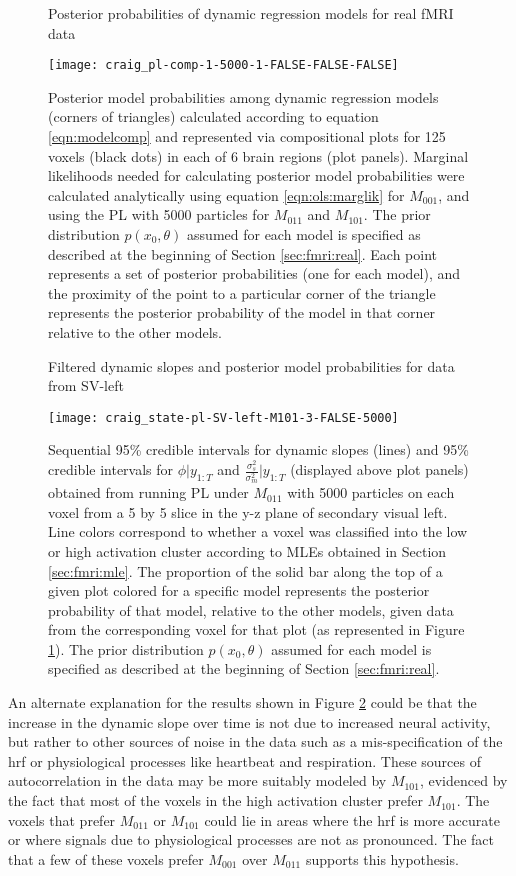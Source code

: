 \begin{figure}
\ssp
\centering
\caption{Posterior probabilities of dynamic regression models for real fMRI data} \label{fig:fmri:comp:real}
\texttt{[image: craig\_pl-comp-1-5000-1-FALSE-FALSE-FALSE]}
\caption*{Posterior model probabilities among dynamic regression models (corners of triangles) calculated according to equation \eqref{eqn:modelcomp} and represented via compositional plots for 125 voxels (black dots) in each of 6 brain regions (plot panels). Marginal likelihoods needed for calculating posterior model probabilities were calculated analytically using equation \eqref{eqn:ols:marglik} for $M_{001}$, and using the PL with 5000 particles for $M_{011}$ and $M_{101}$. The prior distribution $p(x_0,\theta)$ assumed for each model is specified as described at the beginning of Section \ref{sec:fmri:real}. Each point represents a set of posterior probabilities (one for each model), and the proximity of the point to a particular corner of the triangle represents the posterior probability of the model in that corner relative to the other models.}
\end{figure}

\begin{figure}
\ssp
\centering
\caption{Filtered dynamic slopes and posterior model probabilities for data from SV-left} \label{fig:fmri:slopes:real}
\texttt{[image: craig\_state-pl-SV-left-M101-3-FALSE-5000]}
\caption*{Sequential 95\% credible intervals for dynamic slopes (lines) and 95\% credible intervals for $\phi|y_{1:T}$ and $\frac{\sigma^2_s}{\sigma^2_m}|y_{1:T}$ (displayed above plot panels) obtained from running PL under $M_{011}$ with 5000 particles on each voxel from a 5 by 5 slice in the y-z plane of secondary visual left. Line colors correspond to whether a voxel was classified into the low or high activation cluster according to MLEs obtained in Section \ref{sec:fmri:mle}. The proportion of the solid bar along the top of a given plot colored for a specific model represents the posterior probability of that model, relative to the other models, given data from the corresponding voxel for that plot (as represented in Figure \ref{fig:fmri:comp:real}). The prior distribution $p(x_0,\theta)$ assumed for each model is specified as described at the beginning of Section \ref{sec:fmri:real}.}
\end{figure}

An alternate explanation for the results shown in Figure \ref{fig:fmri:slopes:real} could be that the increase in the dynamic slope over time is not due to increased neural activity, but rather to other sources of noise in the data such as a mis-specification of the hrf or physiological processes like heartbeat and respiration. These sources of autocorrelation in the data may be more suitably modeled by $M_{101}$, evidenced by the fact that most of the voxels in the high activation cluster prefer $M_{101}$. The voxels that prefer $M_{011}$ or $M_{101}$ could lie in areas where the hrf is more accurate or where signals due to physiological processes are not as pronounced. The fact that a few of these voxels prefer $M_{001}$ over $M_{011}$ supports this hypothesis.


